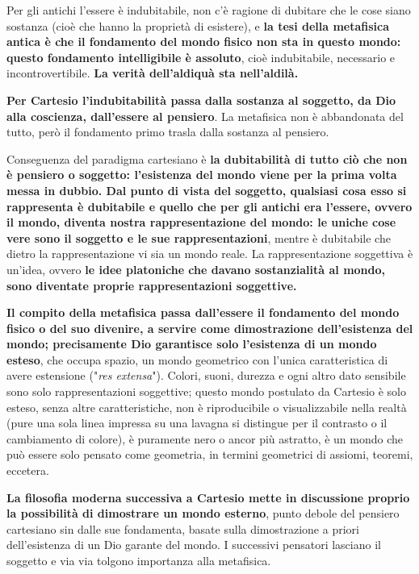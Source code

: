 Per gli antichi l'essere è indubitabile, non c'è ragione di dubitare che le cose siano sostanza (cioè che hanno la proprietà di esistere), e \textbf{la tesi della metafisica antica è che il fondamento del mondo fisico non sta in questo mondo: questo fondamento intelligibile è assoluto}, cioè indubitabile, necessario e incontrovertibile. \textbf{La verità dell'aldiquà sta nell'aldilà.}

\textbf{Per Cartesio l'indubitabilità passa dalla sostanza al soggetto, da Dio alla coscienza, dall'essere al pensiero}. La metafisica non è abbandonata del tutto, però il fondamento primo trasla dalla sostanza al pensiero.

Conseguenza del paradigma cartesiano è \textbf{la dubitabilità di tutto ciò che non è pensiero o soggetto: l'esistenza del mondo viene per la prima volta messa in dubbio. Dal punto di vista del soggetto, qualsiasi cosa esso si rappresenta è dubitabile e quello che per gli antichi era l'essere, ovvero il mondo, diventa nostra rappresentazione del mondo: le uniche cose vere sono il soggetto e le sue rappresentazioni}, mentre è dubitabile che dietro la rappresentazione vi sia un mondo reale. La rappresentazione soggettiva è un'idea, ovvero \textbf{le idee platoniche che davano sostanzialità al mondo, sono diventate proprie rappresentazioni soggettive.}

\textbf{Il compito della metafisica passa dall'essere il fondamento del mondo fisico o del suo divenire, a servire come dimostrazione dell'esistenza del mondo; precisamente Dio garantisce solo l'esistenza di un mondo esteso}, che occupa spazio, un mondo geometrico con l'unica caratteristica di avere estensione ("\textit{res extensa}"). Colori, suoni, durezza e ogni altro dato sensibile sono solo rappresentazioni soggettive; questo mondo postulato da Cartesio è solo esteso, senza altre caratteristiche, non è riproducibile o visualizzabile nella realtà (pure una sola linea impressa su una lavagna si distingue per il contrasto o il cambiamento di colore), è puramente nero o ancor più astratto, è un mondo che può essere solo pensato come geometria, in termini geometrici di assiomi, teoremi, eccetera.

\textbf{La filosofia moderna successiva a Cartesio mette in discussione proprio la possibilità di dimostrare un mondo esterno}, punto debole del pensiero cartesiano sin dalle sue fondamenta, basate sulla dimostrazione a priori dell'esistenza di un Dio garante del mondo. I successivi pensatori lasciano il soggetto e via via tolgono importanza alla metafisica.


